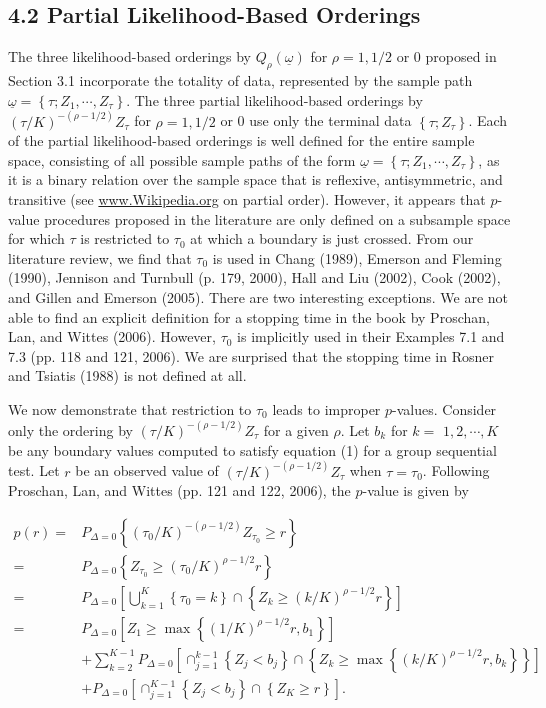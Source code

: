 \documentclass[10pt]{article}
\begin{document}
\subsection*{4.2 Partial Likelihood-Based Orderings}
The three likelihood-based orderings by $Q_{\rho}(\underline{\omega})$ for $\rho=1,1 / 2$ or 0 proposed in Section 3.1 incorporate the totality of data, represented by the sample path $\underline{\omega}=\left\{\tau ; Z_{1}, \cdots, Z_{\tau}\right\}$. The three partial likelihood-based orderings by $(\tau / K)^{-(\rho-1 / 2)} Z_{\tau}$ for $\rho=1,1 / 2$ or 0 use only the terminal data $\left\{\tau ; Z_{\tau}\right\}$. Each of the partial likelihood-based orderings is well defined for the entire sample space, consisting of all possible sample paths of the form $\underline{\omega}=\left\{\tau ; Z_{1}, \cdots, Z_{\tau}\right\}$, as it is a binary relation over the sample space that is reflexive, antisymmetric, and transitive (see \href{http://www.Wikipedia.org}{www.Wikipedia.org} on partial order). However, it appears that $p$-value procedures proposed in the literature are only defined on a subsample space for which $\tau$ is restricted to $\tau_{0}$ at which a boundary is just crossed. From our literature review, we find that $\tau_{0}$ is used in Chang (1989), Emerson and Fleming (1990), Jennison and Turnbull (p. 179, 2000), Hall and Liu (2002), Cook (2002), and Gillen and Emerson (2005). There are two interesting exceptions. We are not able to find an explicit definition for a stopping time in the book by Proschan, Lan, and Wittes (2006). However, $\tau_{0}$ is implicitly used in their Examples 7.1 and 7.3 (pp. 118 and 121, 2006). We are surprised that the stopping time in Rosner and Tsiatis (1988) is not defined at all.

We now demonstrate that restriction to $\tau_{0}$ leads to improper $p$-values. Consider only the ordering by $(\tau / K)^{-(\rho-1 / 2)} Z_{\tau}$ for a given $\rho$. Let $b_{k}$ for $k=$ $1,2, \cdots, K$ be any boundary values computed to satisfy equation (1) for a group sequential test. Let $r$ be an observed value of $(\tau / K)^{-(\rho-1 / 2)} Z_{\tau}$ when $\tau=\tau_{0}$. Following Proschan, Lan, and Wittes (pp. 121 and 122, 2006), the $p$-value is given by


\begin{align*}
p(r)= & P_{\Delta=0}\left\{\left(\tau_{0} / K\right)^{-(\rho-1 / 2)} Z_{\tau_{0}} \geq r\right\} \\
= & P_{\Delta=0}\left\{Z_{\tau_{0}} \geq\left(\tau_{0} / K\right)^{\rho-1 / 2} r\right\} \\
= & P_{\Delta=0}\left[\bigcup_{k=1}^{K}\left\{\tau_{0}=k\right\} \cap\left\{Z_{k} \geq(k / K)^{\rho-1 / 2} r\right\}\right] \\
= & P_{\Delta=0}\left[Z_{1} \geq \max \left\{(1 / K)^{\rho-1 / 2} r, b_{1}\right\}\right] \\
& +\sum_{k=2}^{K-1} P_{\Delta=0}\left[\cap_{j=1}^{k-1}\left\{Z_{j}<b_{j}\right\} \cap\left\{Z_{k} \geq \max \left\{(k / K)^{\rho-1 / 2} r, b_{k}\right\}\right\}\right] \\
& +P_{\Delta=0}\left[\cap_{j=1}^{K-1}\left\{Z_{j}<b_{j}\right\} \cap\left\{Z_{K} \geq r\right\}\right] . \tag{15}
\end{align*}
\end{document}
